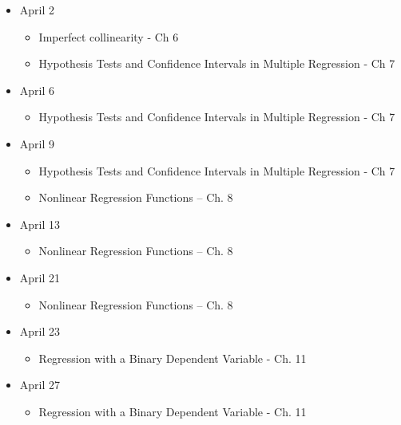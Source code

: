 \documentclass[
]{book}
\providecommand{\tightlist}{%
  \setlength{\itemsep}{0pt}\setlength{\parskip}{0pt}}
\begin{document}
\begin{itemize}
\tightlist
\item
  April 2

  \begin{itemize}
  \tightlist
  \item
    Imperfect collinearity - Ch 6\\
  \item
    Hypothesis Tests and Confidence Intervals in Multiple Regression - Ch 7
  \end{itemize}
\item
  April 6

  \begin{itemize}
  \tightlist
  \item
    Hypothesis Tests and Confidence Intervals in Multiple Regression - Ch 7
  \end{itemize}
\item
  April 9

  \begin{itemize}
  \tightlist
  \item
    Hypothesis Tests and Confidence Intervals in Multiple Regression - Ch 7
  \item
    Nonlinear Regression Functions -- Ch. 8
  \end{itemize}
\item
  April 13

  \begin{itemize}
  \tightlist
  \item
    Nonlinear Regression Functions -- Ch. 8
  \end{itemize}
\item
  April 21

  \begin{itemize}
  \tightlist
  \item
    Nonlinear Regression Functions -- Ch. 8
  \end{itemize}
\item
  April 23

  \begin{itemize}
  \tightlist
  \item
    Regression with a Binary Dependent Variable - Ch. 11
  \end{itemize}
\item
  April 27

  \begin{itemize}
  \tightlist
  \item
    Regression with a Binary Dependent Variable - Ch. 11
  \end{itemize}
\end{itemize}

\backmatter
  
\end{document}
